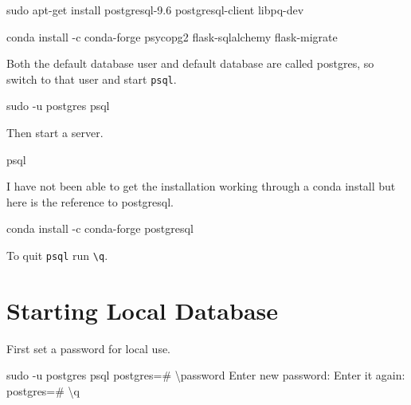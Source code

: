 \documentclass[]{book}
\newenvironment{Shaded}{\begin{snugshade}}{\end{snugshade}}
\newcommand{\FunctionTok}[1]{\textcolor[rgb]{0.00,0.00,0.00}{#1}}
\newcommand{\VariableTok}[1]{\textcolor[rgb]{0.00,0.00,0.00}{#1}}
\newcommand{\ExtensionTok}[1]{#1}
\newcommand{\NormalTok}[1]{#1}
\begin{document}
\begin{Shaded}
\begin{Highlighting}[]
\FunctionTok{sudo}\NormalTok{ apt-get install postgresql-9.6 postgresql-client libpq-dev}
\end{Highlighting}
\end{Shaded}

conda install -c conda-forge psycopg2 flask-sqlalchemy flask-migrate

Both the default database user and default database are called postgres,
so switch to that user and start \texttt{psql}.

\begin{Shaded}
\begin{Highlighting}[]
\FunctionTok{sudo}\NormalTok{ -u postgres psql}
\end{Highlighting}
\end{Shaded}

Then start a server.

\begin{Shaded}
\begin{Highlighting}[]
\ExtensionTok{psql}
\end{Highlighting}
\end{Shaded}

I have not been able to get the installation working through a conda
install but here is the reference to postgresql.

\begin{Shaded}
\begin{Highlighting}[]
\ExtensionTok{conda}\NormalTok{ install -c conda-forge postgresql}
\end{Highlighting}
\end{Shaded}

To quit \texttt{psql} run \texttt{\textbackslash{}q}.

\section{Starting Local Database}\label{starting-local-database}

First set a password for local use.

\begin{Shaded}
\begin{Highlighting}[]
\FunctionTok{sudo}\NormalTok{ -u postgres psql}
\VariableTok{postgres=}\NormalTok{# \textbackslash{}}\ExtensionTok{password}
\ExtensionTok{Enter}\NormalTok{ new password:}
\ExtensionTok{Enter}\NormalTok{ it again:}
\VariableTok{postgres=}\NormalTok{# \textbackslash{}}\ExtensionTok{q}
\end{Highlighting}
\end{Shaded}
\end{document}
